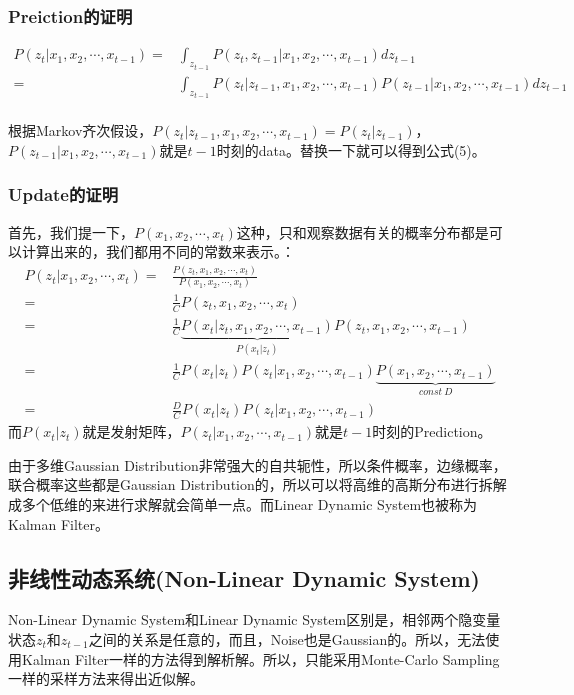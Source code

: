 \documentclass[a4paper]{article}
\begin{document}
\subsubsection{Preiction的证明}
\begin{equation}
    \begin{split}
        P(z_t|x_1,x_2,\cdots,x_{t-1}) 
        = & \int_{z_{t-1}} P(z_t,z_{t-1}|x_1,x_2,\cdots,x_{t-1}) dz_{t-1} \\
        = & \int_{z_{t-1}} P(z_t|z_{t-1},x_1,x_2,\cdots,x_{t-1}) P(z_{t-1}|x_1,x_2,\cdots,x_{t-1}) dz_{t-1} \\
    \end{split}
\end{equation}

根据Markov齐次假设，$P(z_t|z_{t-1},x_1,x_2,\cdots,x_{t-1})=P(z_t|z_{t-1})$，$P(z_{t-1}|x_1,x_2,\cdots,x_{t-1})$就是$t-1$时刻的data。替换一下就可以得到公式(5)。

\subsubsection{Update的证明}
首先，我们提一下，$P(x_1,x_2,\cdots,x_t)$这种，只和观察数据有关的概率分布都是可以计算出来的，我们都用不同的常数来表示。：
\begin{equation}
    \begin{split}
        P(z_t|x_1,x_2,\cdots,x_t) 
        = & \frac{P(z_t,x_1,x_2,\cdots,x_t)}{P(x_1,x_2,\cdots,x_t)}  \\
        = & \frac{1}{C} P(z_t,x_1,x_2,\cdots,x_t) \\
        = & \frac{1}{C} \underbrace{P(x_t|z_t,x_1,x_2,\cdots,x_{t-1})}_{P(x_t|z_t)}P(z_t,x_1,x_2,\cdots,x_{t-1}) \\
        = & \frac{1}{C} P(x_t|z_t)P(z_t|x_1,x_2,\cdots,x_{t-1})\underbrace{P(x_1,x_2,\cdots,x_{t-1})}_{const\ D} \\
        = & \frac{D}{C}P(x_t|z_t)P(z_t|x_1,x_2,\cdots,x_{t-1})
    \end{split}
\end{equation}
而$P(x_t|z_t)$就是发射矩阵，$P(z_t|x_1,x_2,\cdots,x_{t-1})$就是$t-1$时刻的Prediction。

由于多维Gaussian Distribution非常强大的自共轭性，所以条件概率，边缘概率，联合概率这些都是Gaussian Distribution的，所以可以将高维的高斯分布进行拆解成多个低维的来进行求解就会简单一点。而Linear Dynamic System也被称为Kalman Filter。

\subsection{非线性动态系统(Non-Linear Dynamic System)}
Non-Linear Dynamic System和Linear Dynamic System区别是，相邻两个隐变量状态$z_t$和$z_{t-1}$之间的关系是任意的，而且，Noise也是Gaussian的。所以，无法使用Kalman Filter一样的方法得到解析解。所以，只能采用Monte-Carlo Sampling一样的采样方法来得出近似解。
\end{document}
